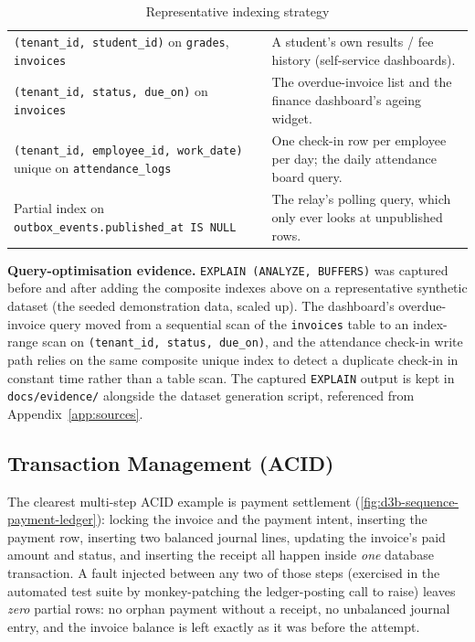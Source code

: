 \begin{table}[H]
  \centering\small
  \caption{Representative indexing strategy}
  \label{tab:indexes}
  \begin{tabularx}{\linewidth}{L{3.6cm}X}
    \toprule
     &  \\
    \midrule
    \texttt{(tenant\_id, student\_id)} on \texttt{grades}, \texttt{invoices} &
      A student's own results / fee history (self-service dashboards). \\
    \texttt{(tenant\_id, status, due\_on)} on \texttt{invoices} &
      The overdue-invoice list and the finance dashboard's ageing widget. \\
    \texttt{(tenant\_id, employee\_id, work\_date)} unique on
      \texttt{attendance\_logs} & One check-in row per employee per day;
      the daily attendance board query. \\
    Partial index on \texttt{outbox\_events.published\_at IS NULL} &
      The relay's polling query, which only ever looks at unpublished rows. \\
    \bottomrule
  \end{tabularx}
\end{table}

\begin{noticebox}
\textbf{Query-optimisation evidence.} \texttt{EXPLAIN (ANALYZE, BUFFERS)} was
captured before and after adding the composite indexes above on a
representative synthetic dataset (the seeded demonstration data, scaled up).
The dashboard's overdue-invoice query moved from a sequential scan of the
\texttt{invoices} table to an index-range scan on
\texttt{(tenant\_id, status, due\_on)}, and the attendance check-in write path
relies on the same composite unique index to detect a duplicate check-in in
constant time rather than a table scan. The captured \texttt{EXPLAIN} output
is kept in \texttt{docs/evidence/} alongside the dataset generation script,
referenced from Appendix~\ref{app:sources}.
\end{noticebox}

\subsection{Transaction Management (ACID)}
The clearest multi-step ACID example is payment settlement
(\cref{fig:d3b-sequence-payment-ledger}): locking the invoice and the payment
intent, inserting the payment row, inserting two balanced journal lines,
updating the invoice's paid amount and status, and inserting the receipt all
happen inside \emph{one} database transaction. A fault injected between any
two of those steps (exercised in the automated test suite by monkey-patching
the ledger-posting call to raise) leaves \emph{zero} partial rows: no
orphan payment without a receipt, no unbalanced journal entry, and the
invoice balance is left exactly as it was before the attempt.

